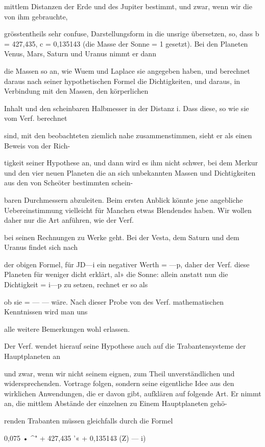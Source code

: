 \documentclass[10pt,a4paper]{article}
\begin{document}
mittlem Distanzen der Erde und des Jupiter bestimmt, und zwar, wenn wir die von ihm gebrauchte,

grösstentheils sehr confuse, Darstellungsform in die unsrige übersetzen, so, dass b = 427,435, c = 0,135143 (die Masse der Sonne = 1 gesetzt). Bei den Planeten Venus, Mars, Saturn und Uranus nimmt er dann

die Massen so an, wie Wuem und Laplace sie angegeben haben, und berechnet daraus nach seiner hypothetischen Formel die Dichtigkeiten, und daraus, in Verbindung mit den Massen, den körperlichen

Inhalt und den scheinbaren Halbmesser in der Distanz i. Dass diese, so wie sie vom Verf. berechnet

sind, mit den beobachteten ziemlich nahe zusammenstimmen, sieht er als einen Beweis von der Rich-

tigkeit seiner Hypothese an, und dann wird es ihm nicht schwer, bei dem Merkur und den vier neuen Planeten die an sich unbekannten Massen und Dichtigkeiten aus den von Scheöter bestimmten schein-

baren Durchmessern abzuleiten. Beim ersten Anblick könnte jene angebliche Uebereinstimmung vielleicht für Manchen etwas Blendendes haben. Wir wollen daher nur die Art anführen, wie der Verf.

bei seinen Rechnungen zu Werke geht. Bei der Vesta, dem Saturn und dem Uranus findet sich nach

der obigen Formel, für JD—i ein negativer Werth = —p, daher der Verf. diese Planeten für weniger dicht erklärt, al» die Sonne: allein anstatt nun die Dichtigkeit = i—p zu setzen, rechnet er so als

ob sie = — — wäre. Nach dieser Probe von des Verf. mathematischen Kenntnissen wird man uns

alle weitere Bemerkungen wohl erlassen.

Der Verf. wendet hierauf seine Hypothese auch auf die Trabantensysteme der Hauptplaneten an

und zwar, wenn wir nicht seinem eignen, zum Theil unverständlichen und widersprechenden. Vortrage folgen, sondern seine eigentliche Idee aus den wirklichen Anwendungen, die er davon gibt, aufklären auf folgende Art. Er nimmt an, die mittlem Abstände der einzelnen zu Einem Hauptplaneten gehö-

renden Trabanten müssen gleichfalls durch die Formel

0,075 • \textasciicircum{}" + 427,435 '« + 0,135143 (Z) — i)
\end{document}

